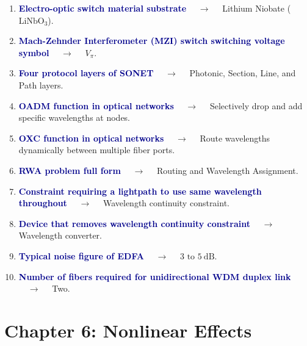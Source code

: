 \documentclass[11pt,a4paper]{article}
\begin{document}
\begin{enumerate}[label=\arabic*., leftmargin=*, labelsep=0.8em, itemsep=0.35em, parsep=0.1em, topsep=0.2em]
  \item \textcolor{darkblue}{\textbf{Electro-optic switch material substrate}} $\quad\to\quad$ Lithium Niobate ($\text{LiNbO}_3$).
  \item \textcolor{darkblue}{\textbf{Mach-Zehnder Interferometer (MZI) switch switching voltage symbol}} $\quad\to\quad$ $V_\pi$.
  \item \textcolor{darkblue}{\textbf{Four protocol layers of SONET}} $\quad\to\quad$ Photonic, Section, Line, and Path layers.
  \item \textcolor{darkblue}{\textbf{OADM function in optical networks}} $\quad\to\quad$ Selectively drop and add specific wavelengths at nodes.
  \item \textcolor{darkblue}{\textbf{OXC function in optical networks}} $\quad\to\quad$ Route wavelengths dynamically between multiple fiber ports.
  \item \textcolor{darkblue}{\textbf{RWA problem full form}} $\quad\to\quad$ Routing and Wavelength Assignment.
  \item \textcolor{darkblue}{\textbf{Constraint requiring a lightpath to use same wavelength throughout}} $\quad\to\quad$ Wavelength continuity constraint.
  \item \textcolor{darkblue}{\textbf{Device that removes wavelength continuity constraint}} $\quad\to\quad$ Wavelength converter.
  \item \textcolor{darkblue}{\textbf{Typical noise figure of EDFA}} $\quad\to\quad$ $3 \text{ to } 5\ \text{dB}$.
  \item \textcolor{darkblue}{\textbf{Number of fibers required for unidirectional WDM duplex link}} $\quad\to\quad$ Two.
\end{enumerate}

\section*{Chapter 6: Nonlinear Effects}
\end{document}
